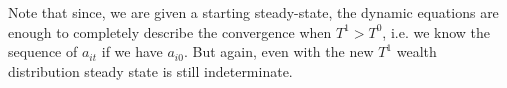 \documentclass[12pt]{article}
\newcommand{\1}{{\bf 1}} %
\begin{document}
\begin{enumerate}[(1)]
\begin{figure}[H]
\begin{center}
	\end{center}
\end{figure}

Note that since, we are given a starting steady-state, the dynamic equations are enough to completely describe the convergence when $T^1>T^0$, i.e. we know the sequence of $a_{it}$ if we have $a_{i0}$. But again, even with the new $T^1$ wealth distribution steady state is still indeterminate. 
	
\end{enumerate}
\end{document}
